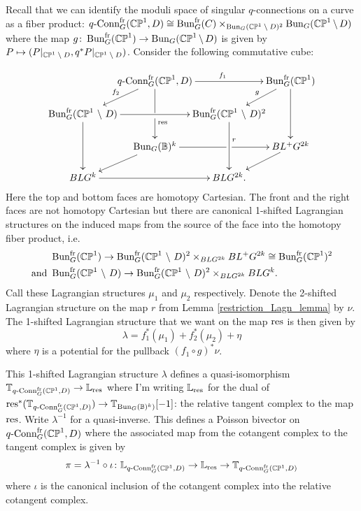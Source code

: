 \documentclass[10pt, oneside]{article}
\newcommand{\qconn}{q\text{-Conn}}
\newcommand{\fr}{\mathrm{fr}}
\begin{document}
\begin{construction}
Recall that we can identify the moduli space of singular $q$-connections on a curve as a fiber product: $\qconn_G^{\fr}(\bb{CP}^1, D) \iso \bun_G^\fr(C) \times_{\bun_G(\bb{CP}^1 \! \bs \! D)^2} \bun_G(\bb{CP}^1 \! \bs \! D)$ where the map $g \colon \bun_G^\fr(\bb{CP}^1) \to \bun_G(\bb{CP}^1 \! \bs \! D)$ is given by $P \mapsto (P|_{\mathbb{CP}^1 \! \ \backslash \  \! D}, q^*P|_{\mathbb{CP}^1 \! \ \backslash \  \! D})$.  Consider the following commutative cube:

\[\xymatrix@C-30pt@R-8pt{
& \qconn_G^{\fr}(\bb{CP}^1, D) \ar[rr]^{f_1} \ar'[d][dd]^(.25){\mr{res}} & & \bun_G^{\fr}(\bb{CP}^1) \ar[dd]
\\
\bun_G^{\fr}(\bb{CP}^1 \bs D) \ar@{<-}[ur]^{f_2} \ar[rr]\ar[dd] & & \bun_G^{\fr}(\bb{CP}^1 \bs D)^2 \ar@{<-}[ur]^g \ar[dd]^(.4)r
\\
& \bun_G(\bb B)^k \ar'[r][rr] & & BL^+G^{2k}
\\
BLG^k \ar[rr]\ar@{<-}[ur] & & BLG^{2k}. \ar@{<-}[ur]
}\]
Here the top and bottom faces are homotopy Cartesian.  The front and the right faces are not homotopy Cartesian but there are canonical 1-shifted Lagrangian structures on the induced maps from the source of the face into the homotopy fiber product, i.e.
\begin{align*}
&\bun_G^{\fr}(\bb{CP}^1) \to \bun_G^{\fr}(\bb{CP}^1 \bs D)^2 \times_{BLG^{2k}} BL^+G^{2k} \iso \bun_G^{\fr}(\bb{CP}^1)^2 \\
\text{and } &\bun_G^{\fr}(\bb{CP}^1 \bs D) \to \bun_G^{\fr}(\bb{CP}^1 \bs D)^2 \times_{BLG^{2k}} BLG^{k}.
\end{align*}
Call these Lagrangian structures $\mu_1$ and $\mu_2$ respectively.  Denote the 2-shifted Lagrangian structure on the map $r$ from Lemma \ref{restriction_Lagn_lemma} by $\nu$.  The 1-shifted Lagrangian structure that we want on the map $\mathrm{res}$ is then given by 
\[\lambda = f_1^*(\mu_1) + f_2^*(\mu_2) + \eta
\]
where $\eta$ is a potential for the pullback $(f_1 \circ g)^*\nu$.

This 1-shifted Lagrangian structure $\lambda$ defines a quasi-isomorphism $\bb T_{\qconn_G^{\fr}(\bb{CP}^1, D)} \to \bb L_{\mr{res}}$ where I'm writing $\mathbb{L}_{\mathrm{res}}$ for the dual of $\mr{res}^*(\bb T_{\qconn_G^{\fr}(\bb{CP}^1, D)}) \to \bb T_{\bun_G(\bb B)^k)}[-1]$: the relative tangent complex to the map $\mathrm{res}$.  Write $\lambda^{-1}$ for a quasi-inverse.  This defines a Poisson bivector on $\qconn_G^{\fr}(\bb{CP}^1, D)$ where the associated map from the cotangent complex to the tangent complex is given by
\[\pi = \lambda^{-1} \circ \iota \colon \bb L_{\qconn_G^{\fr}(\bb{CP}^1, D)} \to \bb L_{\mr{res}} \to \bb T_{\qconn_G^{\fr}(\bb{CP}^1, D)}\]
where $\iota$ is the canonical inclusion of the cotangent complex into the relative cotangent complex.


\end{construction}
\end{document}
